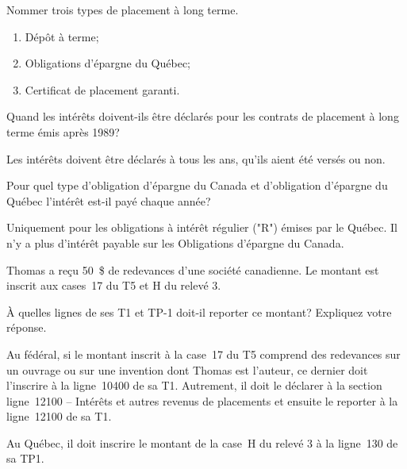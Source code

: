 \begin{question}
	Nommer trois types de placement à long terme.
\end{question}
\begin{enumerate}
	\item Dépôt à terme;
	\item Obligations d'épargne du Québec;
	\item Certificat de placement garanti.
\end{enumerate}

\begin{question}
	Quand les intérêts doivent-ils être déclarés pour les contrats de placement à long terme émis après 1989?
\end{question}
Les intérêts doivent être déclarés à tous les ans, qu'ils aient été versés ou non.

\begin{question}
	Pour quel type d'obligation d'épargne du Canada et d'obligation d'épargne du Québec l'intérêt est-il payé chaque année?
\end{question}
Uniquement pour les obligations à intérêt régulier ("R") émises par le Québec. Il n'y a plus d'intérêt payable sur les Obligations d'épargne du Canada.

\begin{question}
	Thomas a reçu 50~\$ de redevances d'une société canadienne. Le montant est inscrit aux cases~17 du T5 et H du relevé 3.
	
	À quelles lignes de ses T1 et TP-1 doit-il reporter ce montant? Expliquez votre réponse.
\end{question}
Au fédéral, si le montant inscrit à la case~17 du T5 comprend des redevances sur un ouvrage ou sur une invention dont Thomas est l'auteur, ce dernier doit l'inscrire à la ligne~10400 de sa T1. Autrement, il doit le déclarer à la section ligne~12100 – Intérêts et autres revenus de placements et ensuite le reporter à la ligne~12100 de sa T1.

Au Québec, il doit inscrire le montant de la case~H du relevé 3 à la ligne~130 de sa TP1.

